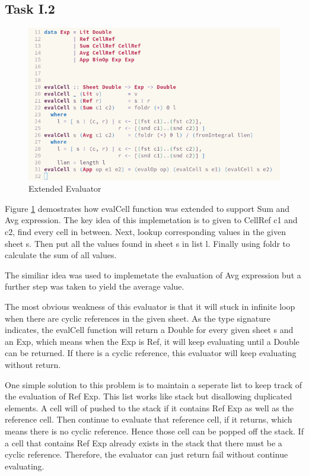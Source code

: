 \documentclass{article}
\begin{document}
\begin{normalsize}
  \section{Task I.2}

  \begin{figure}[H]
    \centering
    \centerline{\includegraphics[scale=0.6]{Sheet}}
    \caption{Extended Evaluator}
    \label{fig:sheet}
  \end{figure}

  Figure \ref{fig:sheet} demostrates how evalCell function was extended to
  support Sum and Avg expression. The key idea of this implemetation is to given
  to CellRef c1 and c2, find every cell in between. Next, lookup corresponding
  values in the given sheet s. Then put all the values found in sheet s in list
  l. Finally using foldr to calculate the sum of all values.

  The similiar idea was used to implemetate the evaluation of Avg expression but
  a further step was taken to yield the average value.

  The most obvious weakness of this evaluator is that it will stuck in infinite
  loop when there are cyclic references in the given sheet. As the type
  signature indicates, the evalCell function will return a Double for every
  given sheet s and an Exp, which means when the Exp is Ref, it will keep
  evaluating until a Double can be returned. If there is a cyclic reference,
  this evaluator will keep evaluating without return.

  One simple solution to this problem is to maintain a seperate list to keep
  track of the evaluation of Ref Exp. This list works like stack but disallowing
  duplicated elements. A cell will of pushed to the stack if it contains Ref Exp
  as well as the reference cell. Then continue to evaluate that reference cell,
  if it returns, which means there is no cyclic reference. Hence those cell can
  be popped off the stack. If a cell that contains Ref Exp already exists in the
  stack that there must be a cyclic reference. Therefore, the evaluator can just
  return fail without continue evaluating.


\end{normalsize}
\end{document}
